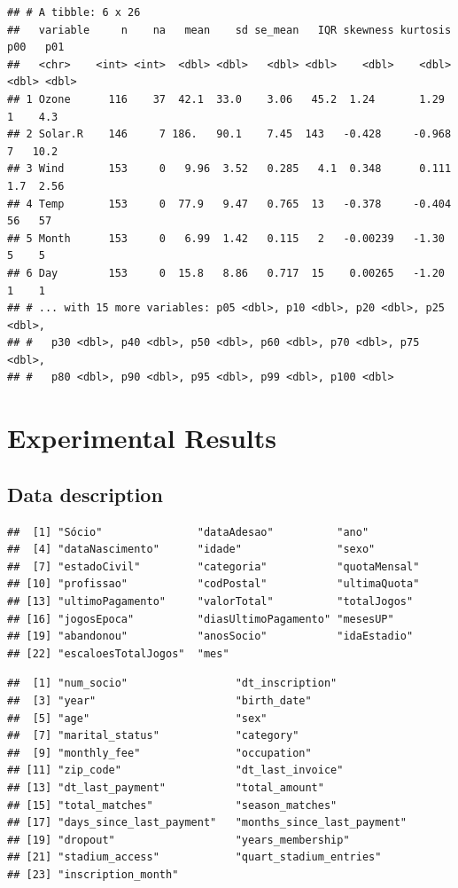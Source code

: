 \documentclass[
  12pt,
]{article}
\begin{document}
\begin{verbatim}
## # A tibble: 6 x 26
##   variable     n    na   mean    sd se_mean   IQR skewness kurtosis   p00   p01
##   <chr>    <int> <int>  <dbl> <dbl>   <dbl> <dbl>    <dbl>    <dbl> <dbl> <dbl>
## 1 Ozone      116    37  42.1  33.0    3.06   45.2  1.24       1.29    1    4.3 
## 2 Solar.R    146     7 186.   90.1    7.45  143   -0.428     -0.968   7   10.2 
## 3 Wind       153     0   9.96  3.52   0.285   4.1  0.348      0.111   1.7  2.56
## 4 Temp       153     0  77.9   9.47   0.765  13   -0.378     -0.404  56   57   
## 5 Month      153     0   6.99  1.42   0.115   2   -0.00239   -1.30    5    5   
## 6 Day        153     0  15.8   8.86   0.717  15    0.00265   -1.20    1    1   
## # ... with 15 more variables: p05 <dbl>, p10 <dbl>, p20 <dbl>, p25 <dbl>,
## #   p30 <dbl>, p40 <dbl>, p50 <dbl>, p60 <dbl>, p70 <dbl>, p75 <dbl>,
## #   p80 <dbl>, p90 <dbl>, p95 <dbl>, p99 <dbl>, p100 <dbl>
\end{verbatim}

\hypertarget{experimental-results}{%
\section{Experimental Results}\label{experimental-results}}

\hypertarget{data-description}{%
\subsection{Data description}\label{data-description}}

\begin{verbatim}
##  [1] "Sócio"               "dataAdesao"          "ano"                
##  [4] "dataNascimento"      "idade"               "sexo"               
##  [7] "estadoCivil"         "categoria"           "quotaMensal"        
## [10] "profissao"           "codPostal"           "ultimaQuota"        
## [13] "ultimoPagamento"     "valorTotal"          "totalJogos"         
## [16] "jogosEpoca"          "diasUltimoPagamento" "mesesUP"            
## [19] "abandonou"           "anosSocio"           "idaEstadio"         
## [22] "escaloesTotalJogos"  "mes"
\end{verbatim}

\begin{verbatim}
##  [1] "num_socio"                 "dt_inscription"           
##  [3] "year"                      "birth_date"               
##  [5] "age"                       "sex"                      
##  [7] "marital_status"            "category"                 
##  [9] "monthly_fee"               "occupation"               
## [11] "zip_code"                  "dt_last_invoice"          
## [13] "dt_last_payment"           "total_amount"             
## [15] "total_matches"             "season_matches"           
## [17] "days_since_last_payment"   "months_since_last_payment"
## [19] "dropout"                   "years_membership"         
## [21] "stadium_access"            "quart_stadium_entries"    
## [23] "inscription_month"
\end{verbatim}
\end{document}
